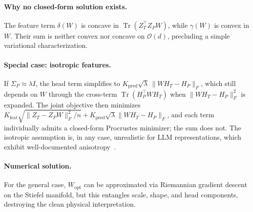 \paragraph{Why no closed-form solution exists.}
The feature term $\delta(W)$ is concave in $\operatorname{Tr}(Z_T^\top Z_P W)$, while $\gamma(W)$ is convex in $W$. Their sum is neither convex nor concave on $\mathcal{O}(d)$, precluding a simple variational characterization.

\paragraph{Special case: isotropic features.}
If $\Sigma_P \approx \lambda I$, the head term simplifies to $K_{\mathrm{pred}}\sqrt{\lambda}\,\|W H_T - H_P\|_F$, which still depends on $W$ through the cross-term $\operatorname{Tr}(H_P^\top W H_T)$ when $\|W H_T - H_P\|_F^2$ is expanded. The joint objective then minimizes $K_{\mathrm{feat}}\sqrt{\|Z_T - Z_P W\|_F^2/n} + K_{\mathrm{pred}}\sqrt{\lambda}\|W H_T - H_P\|_F$, and each term individually admits a closed-form Procrustes minimizer; the sum does not. The isotropic assumption is, in any case, unrealistic for LLM representations, which exhibit well-documented anisotropy~\citep{ethayarajh2019contextual}.

\paragraph{Numerical solution.}
For the general case, $W_{\mathrm{opt}}$ can be approximated via Riemannian gradient descent on the Stiefel manifold, but this entangles scale, shape, and head components, destroying the clean physical interpretation.

